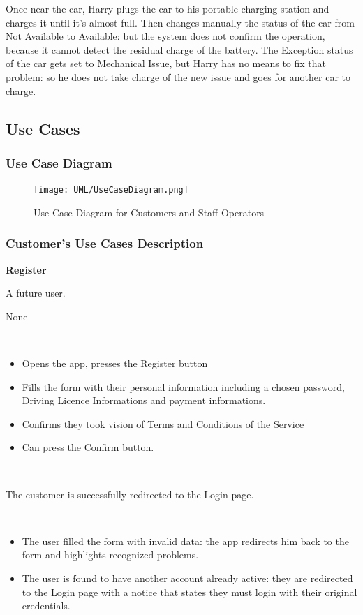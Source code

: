 \documentclass[11pt]{article} %
\begin{document}
Once near the car, Harry plugs the car to his portable charging station and charges it until it's almost full. Then changes manually the status of the car from Not Available to Available: but the system does not confirm the operation, because it cannot detect the residual charge of the battery. The Exception status of the car gets set to Mechanical Issue, but Harry has no means to fix that problem: so he does not take charge of the new issue and goes for another car to charge.


\subsection{Use Cases}

\subsubsection{Use Case Diagram}
\begin{figure}[H]
	\centering
	\texttt{[image: UML/UseCaseDiagram.png]}
	\caption{Use Case Diagram for Customers and Staff Operators}
\end{figure}

\subsubsection{Customer's Use Cases Description}

\begin{description}[noitemsep,topsep=0pt,parsep=0pt,partopsep=0pt]
	\item[Name:] \textbf{Register}
	\item[Actors Involved:] A future user.
	\item[Entry Conditions:] None
	\item[Flow Of Events:] \hfill\
	\begin{itemize}
		\item Opens the app, presses the Register button
		\item Fills the form with their personal information including a chosen password, Driving Licence Informations and payment informations.
		\item Confirms they took vision of Terms and Conditions of the Service 
		\item Can press the Confirm button.
	\end{itemize} \hfill\
	\item[Exit conditions:] The customer is successfully redirected to the Login page.
	\item[Exceptions:]  \hfill\
	\begin{itemize}
		\item The user filled the form with invalid data: the app redirects him back to the form and highlights recognized problems. 
		\item The user is found to have another account already active: they are redirected to the Login page with a notice that states they must login with their original credentials.
	\end{itemize}
\end{description}
\hfill\
\end{document}
